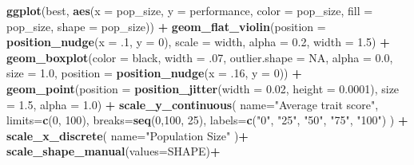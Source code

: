 \documentclass[
]{book}
\newenvironment{Shaded}{\begin{snugshade}}{\end{snugshade}}
\newcommand{\AttributeTok}[1]{\textcolor[rgb]{0.13,0.29,0.53}{#1}}
\newcommand{\ConstantTok}[1]{\textcolor[rgb]{0.56,0.35,0.01}{#1}}
\newcommand{\DecValTok}[1]{\textcolor[rgb]{0.00,0.00,0.81}{#1}}
\newcommand{\FloatTok}[1]{\textcolor[rgb]{0.00,0.00,0.81}{#1}}
\newcommand{\FunctionTok}[1]{\textcolor[rgb]{0.13,0.29,0.53}{\textbf{#1}}}
\newcommand{\NormalTok}[1]{#1}
\newcommand{\SpecialCharTok}[1]{\textcolor[rgb]{0.81,0.36,0.00}{\textbf{#1}}}
\newcommand{\StringTok}[1]{\textcolor[rgb]{0.31,0.60,0.02}{#1}}
\begin{document}
\begin{Shaded}
\begin{Highlighting}[]
\FunctionTok{ggplot}\NormalTok{(best, }\FunctionTok{aes}\NormalTok{(}\AttributeTok{x =}\NormalTok{ pop\_size, }\AttributeTok{y =}\NormalTok{ performance, }\AttributeTok{color =}\NormalTok{ pop\_size, }\AttributeTok{fill =}\NormalTok{ pop\_size, }\AttributeTok{shape =}\NormalTok{ pop\_size)) }\SpecialCharTok{+}
  \FunctionTok{geom\_flat\_violin}\NormalTok{(}\AttributeTok{position =} \FunctionTok{position\_nudge}\NormalTok{(}\AttributeTok{x =}\NormalTok{ .}\DecValTok{1}\NormalTok{, }\AttributeTok{y =} \DecValTok{0}\NormalTok{), }\AttributeTok{scale =} \StringTok{\textquotesingle{}width\textquotesingle{}}\NormalTok{, }\AttributeTok{alpha =} \FloatTok{0.2}\NormalTok{, }\AttributeTok{width =} \FloatTok{1.5}\NormalTok{) }\SpecialCharTok{+}
  \FunctionTok{geom\_boxplot}\NormalTok{(}\AttributeTok{color =} \StringTok{\textquotesingle{}black\textquotesingle{}}\NormalTok{, }\AttributeTok{width =}\NormalTok{ .}\DecValTok{07}\NormalTok{, }\AttributeTok{outlier.shape =} \ConstantTok{NA}\NormalTok{, }\AttributeTok{alpha =} \FloatTok{0.0}\NormalTok{, }\AttributeTok{size =} \FloatTok{1.0}\NormalTok{, }\AttributeTok{position =} \FunctionTok{position\_nudge}\NormalTok{(}\AttributeTok{x =}\NormalTok{ .}\DecValTok{16}\NormalTok{, }\AttributeTok{y =} \DecValTok{0}\NormalTok{)) }\SpecialCharTok{+}
  \FunctionTok{geom\_point}\NormalTok{(}\AttributeTok{position =} \FunctionTok{position\_jitter}\NormalTok{(}\AttributeTok{width =} \FloatTok{0.02}\NormalTok{, }\AttributeTok{height =} \FloatTok{0.0001}\NormalTok{), }\AttributeTok{size =} \FloatTok{1.5}\NormalTok{, }\AttributeTok{alpha =} \FloatTok{1.0}\NormalTok{) }\SpecialCharTok{+}
  \FunctionTok{scale\_y\_continuous}\NormalTok{(}
    \AttributeTok{name=}\StringTok{"Average trait score"}\NormalTok{,}
    \AttributeTok{limits=}\FunctionTok{c}\NormalTok{(}\DecValTok{0}\NormalTok{, }\DecValTok{100}\NormalTok{),}
    \AttributeTok{breaks=}\FunctionTok{seq}\NormalTok{(}\DecValTok{0}\NormalTok{,}\DecValTok{100}\NormalTok{, }\DecValTok{25}\NormalTok{),}
    \AttributeTok{labels=}\FunctionTok{c}\NormalTok{(}\StringTok{"0"}\NormalTok{, }\StringTok{"25"}\NormalTok{, }\StringTok{"50"}\NormalTok{, }\StringTok{"75"}\NormalTok{, }\StringTok{"100"}\NormalTok{)}
\NormalTok{  ) }\SpecialCharTok{+}
  \FunctionTok{scale\_x\_discrete}\NormalTok{(}
    \AttributeTok{name=}\StringTok{"Population Size"}
\NormalTok{  )}\SpecialCharTok{+}
  \FunctionTok{scale\_shape\_manual}\NormalTok{(}\AttributeTok{values=}\NormalTok{SHAPE)}\SpecialCharTok{+}

\end{Highlighting}
\end{Shaded}
\end{document}
